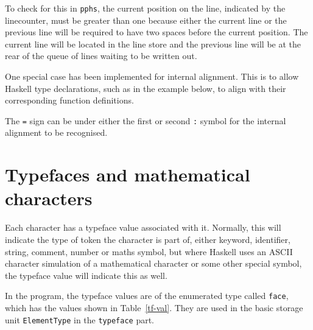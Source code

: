 To check for this in {\tt pphs}, the current position on the line, indicated by
the linecounter, must be greater than one because either the current line or
the previous line will be required to have two spaces before the current position.  The current
line will be located in the line store and the previous line will be at the rear of the queue
of lines waiting to be written out.

One special case has been implemented for internal alignment.  This is to allow Haskell
type declarations, such as in the example below, to align with their corresponding function
definitions.
\begin{quote}

\end{quote}
The {\tt =} sign can be under either the first or second {\tt :} symbol for the
internal alignment to be recognised.

\section{Typefaces and mathematical characters}

Each character has a typeface value associated with it.  Normally, this will
indicate the type of token the character is part of, either keyword, identifier,
string, comment, number or maths symbol, but where Haskell uses an ASCII character
simulation of a mathematical character or some other special symbol, the typeface
value will indicate this as well.

In the program, the typeface values are of the
enumerated type called {\tt face}, which has the values shown in Table~\ref{tf-val}.
They are used in the basic storage unit {\tt ElementType} in the {\tt typeface} part.

